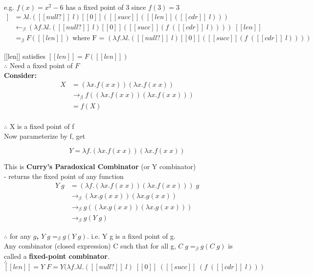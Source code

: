\documentclass[11pt]{article}
\begin{document}
e.g. $f(x) = x^2 - 6$ has a fixed point of 3 since $f(3) = 3$ 
\begin{align*}
[[len]]&=\lambda l.([[null?]]\;l)[[0]]([[succ]]([[len]]([[cdr]]\;l)))\\
&\leftarrow_\beta (\lambda f.\lambda l.([[null?]]\;l)[[0]]([[succ]](f\;([[cdr]]\;l))))\;[[len]] \\
&=_\beta F([[len]])\text{     where F = $(\lambda f.\lambda l.([[null?]]\;l)[[0]]([[succ]](f\;([[cdr]]\;l))))$}
\end{align*}

[[len]] satisfies $[[len]] = F([[len]])$ \\

$\therefore$ Need a fixed point of $F$ \\

{\bf Consider:}
\begin{align*}
X &= (\lambda x.f(x\;x))(\lambda x.f(x\;x)) \\
&\rightarrow_\beta f((\lambda x.f(x\;x))(\lambda x.f(x\;x))) \\
&= f(X) \\
\end{align*}

$\therefore$ X is a fixed point of f \\

Now parameterize by f, get

$$Y = \lambda f.(\lambda x.f(x\;x))(\lambda x.f(x\;x))$$

This is {\bf Curry's Paradoxical Combinator} (or Y combinator) \\

- returns the fixed point of any function \\

\begin{align*}
Y\;g &= (\lambda f.(\lambda x.f(x\;x))(\lambda x.f(x\;x)))\;g \\
&\rightarrow_\beta (\lambda x.g(x\;x))(\lambda x.g(x\;x)) \\
&\rightarrow_\beta g((\lambda x.g(x\;x))(\lambda x.g(x\;x))) \\
&\rightarrow_\beta g(Y\;g) 
\end{align*}

$\therefore$ for any {\bf $g$, $Y\;g =_\beta g(Y\;g)$}. i.e. Y g is a fixed point of g. \\

Any combinator (closed expression) C such that for all g, $C\;g =_\beta g(C\;g)$ is called a {\bf fixed-point combinator}. \\

$\therefore$ $[[len]] = Y\;F = Y(\lambda f.\lambda l.([[null?]]\; l)\;[[0]]\;([[succ]]\;(f\;([[cdr]]\;l)))$ \\
\end{document}
